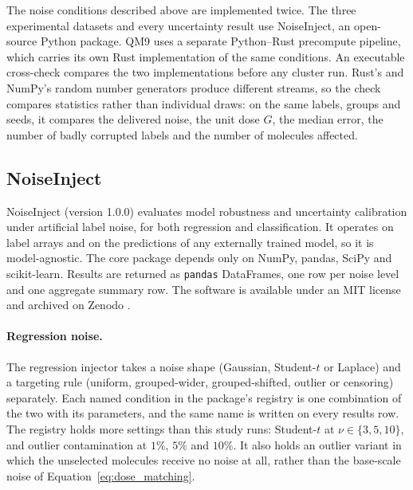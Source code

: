 The noise conditions described above are implemented twice. The three experimental datasets and
every uncertainty result use NoiseInject, an open-source Python package. QM9 uses a separate
Python--Rust precompute pipeline, which carries its own Rust implementation of the same conditions.
An executable cross-check compares the two implementations before any cluster run. Rust's and
NumPy's random number generators produce different streams, so the check compares statistics rather
than individual draws: on the same labels, groups and seeds, it compares the delivered noise, the
unit dose $G$, the median error, the number of badly corrupted labels and the number of molecules
affected.

\subsection{NoiseInject}

NoiseInject (version 1.0.0) evaluates model robustness and uncertainty calibration under artificial
label noise, for both regression and classification. It operates on label arrays and on the
predictions of any externally trained model, so it is model-agnostic. The core package depends only
on NumPy, pandas, SciPy and scikit-learn. Results are returned as \texttt{pandas} DataFrames, one
row per noise level and one aggregate summary row. The software is available under an MIT license
and archived on Zenodo \citep{noiseinject}.

\paragraph{Regression noise.} The regression injector takes a noise shape (Gaussian, Student-$t$ or
Laplace) and a targeting rule (uniform, grouped-wider, grouped-shifted, outlier or censoring)
separately. Each named condition in the package's registry is one combination of the two with its
parameters, and the same name is written on every results row. The registry holds more settings
than this study runs: Student-$t$ at $\nu \in \{3, 5, 10\}$, and outlier contamination at $1\%$,
$5\%$ and $10\%$. It also holds an outlier variant in which the unselected molecules receive no
noise at all, rather than the base-scale noise of Equation~\ref{eq:dose_matching}.

